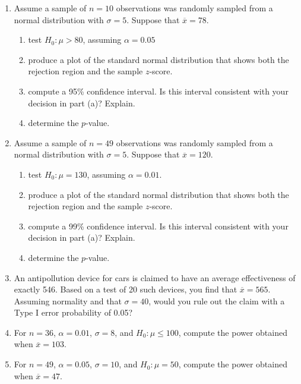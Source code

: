 \documentclass[10pt]{article}
\begin{document}
\begin{enumerate}

\item Assume a sample of $n=10$ observations was randomly sampled from a normal distribution with $\sigma=5$.  Suppose that $\overline{x}=78$.

  \begin{enumerate}
  \item test $H_0:\mu>80$, assuming $\alpha=0.05$
  \item produce a plot of the standard normal distribution that shows both the rejection region and the sample $z$-score.
  \item compute a 95\% confidence interval.  Is this interval consistent with your decision in part (a)? Explain.
    \item determine the $p$-value.
  \end{enumerate}

\item Assume a sample of $n=49$ observations was randomly sampled from a normal distribution with $\sigma=5$.  Suppose that $\overline{x}=120$.

\begin{enumerate}
  \item test $H_0:\mu=130$, assuming $\alpha=0.01$.
  \item produce a plot of the standard normal distribution that shows both the rejection region and the sample $z$-score.
  \item compute a 99\% confidence interval.  Is this interval consistent with your decision in part (a)? Explain.
    \item determine the $p$-value.
  \end{enumerate}

\item An antipollution device for cars is claimed to have an average effectiveness of exactly 546. Based on a test of 20 such devices, you find that $\overline{x}=565$.  Assuming normality and that $\sigma=40$, would you rule out the claim with a Type I error probability of 0.05?

\item For $n=36$, $\alpha=0.01$, $\sigma=8$, and $H_0:\mu\leq 100$, compute the power obtained when $\overline{x}=103$.

\item For $n=49$, $\alpha=0.05$, $\sigma=10$, and $H_0:\mu=50$, compute the power obtained when $\overline{x}=47$.
\end{enumerate}  
\end{document}

